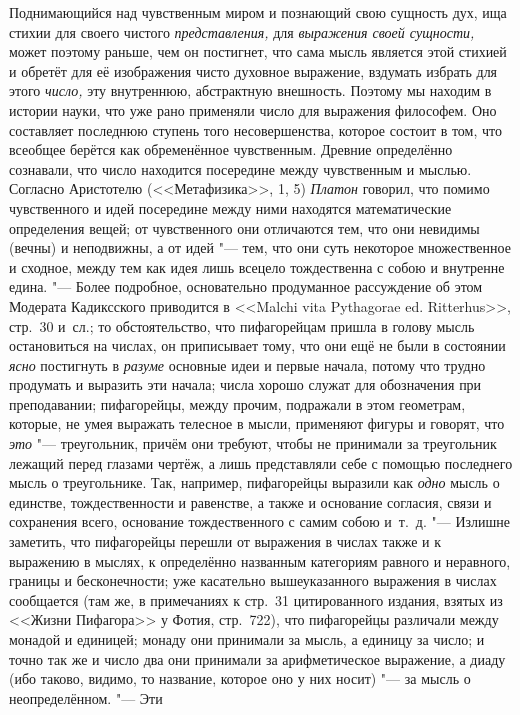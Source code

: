 Поднимающийся над чувственным миром и познающий свою сущность дух, ища стихии
для своего чистого {\em представления,} для {\em выражения своей сущности,}
может поэтому раньше, чем он постигнет, что сама мысль является этой стихией и
обретёт для её изображения чисто духовное выражение, вздумать избрать для этого
{\em число,} эту внутреннюю, абстрактную внешность. Поэтому мы находим в
истории науки, что уже рано применяли число для выражения философем. Оно
составляет последнюю ступень того несовершенства, которое состоит в том, что
всеобщее берётся как обременённое чувственным. Древние определённо сознавали,
что число находится посередине между чувственным и мыслью. Согласно Аристотелю
(<<Метафизика>>, 1, 5) {\em Платон} говорил, что помимо чувственного и идей
посередине между ними находятся математические определения вещей; от
чувственного они отличаются тем, что они невидимы (вечны) и неподвижны, а от
идей "--- тем, что они суть некоторое множественное и сходное, между тем как
идея лишь всецело тождественна с собою и внутренне едина. "--- Более
подробное, основательно продуманное рассуждение об этом Модерата Кадиксского
приводится в <<Malchi vita Pythagorae ed. Ritterhus>>, стр.~30 и~сл.; то
обстоятельство, что пифагорейцам пришла в голову мысль остановиться на числах,
он приписывает тому, что они ещё не были в состоянии {\em ясно} постигнуть в
{\em разуме} основные идеи и первые начала, потому что трудно продумать и
выразить эти начала; числа хорошо служат для обозначения при преподавании;
пифагорейцы, между прочим, подражали в этом геометрам, которые, не умея
выражать телесное в мысли, применяют фигуры и говорят, что {\em это} "---
треугольник, причём они требуют, чтобы не принимали за треугольник лежащий
перед глазами чертёж, а лишь представляли себе с помощью последнего мысль о
треугольнике. Так, например, пифагорейцы выразили как {\em одно} мысль о
единстве, тождественности и равенстве, а также и основание согласия, связи и
сохранения всего, основание тождественного с самим собою и~т.~д. "--- Излишне
заметить, что пифагорейцы перешли от выражения в числах также и к выражению в
мыслях, к определённо названным категориям равного и неравного, границы и
бесконечности; уже касательно вышеуказанного выражения в числах сообщается (там
же, в примечаниях к стр.~31 цитированного издания, взятых из <<Жизни Пифагора>>
у Фотия, стр.~722), что пифагорейцы различали между монадой и единицей; монаду
они принимали за мысль, а единицу за число; и точно так же и число два они
принимали за арифметическое выражение, а диаду (ибо таково, видимо, то
название, которое оно у них носит) "--- за мысль о неопределённом. "--- Эти
